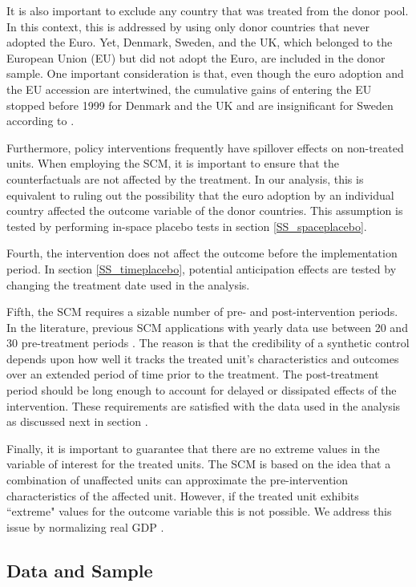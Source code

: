 \documentclass[12pt]{article}
\begin{document}
It is also important to exclude any country that was treated from the donor pool. In this context, this is addressed by using only donor countries that never adopted the Euro. Yet, Denmark, Sweden, and the UK, which belonged to the European Union (EU) but did not adopt the Euro, are included in the donor sample. One important consideration is that, even though the euro adoption and the EU accession are intertwined, the cumulative gains of entering the EU stopped before 1999 for Denmark and the UK and are insignificant for Sweden according to \cite{Campos2018}. 

Furthermore, policy interventions frequently have spillover effects on non-treated units. When employing the SCM, it is important to ensure that the counterfactuals are not affected by the treatment. In our analysis, this is equivalent to ruling out the possibility that the euro adoption by an individual country affected the outcome variable of the donor countries. This assumption is tested by performing in-space placebo tests in section \ref{SS_spaceplacebo}.

Fourth, the intervention does not affect the outcome before the implementation period. In section \ref{SS_timeplacebo}, potential anticipation effects are tested by changing the treatment date used in the analysis.

Fifth, the SCM requires a sizable number of pre- and post-intervention periods. In the literature, previous SCM applications with yearly data use between 20 \citep{Abadie2003} and 30 pre-treatment periods \citep{Abadie2015}. The reason is that the credibility of a synthetic control depends upon how well it tracks the treated unit’s characteristics and outcomes over an extended period of time prior to the treatment. The post-treatment period should be long enough to account for delayed or dissipated effects of the intervention. These requirements are satisfied with the data used in the analysis as discussed next in section \label{SS_Data}.

Finally, it is important to guarantee that there are no extreme values in the variable of interest for the treated units. The SCM is based on the idea that a combination of unaffected units can approximate the pre-intervention characteristics of the affected unit. However, if the treated unit exhibits ``extreme" values for the outcome variable this is not possible. We address this issue by normalizing real GDP \citep{Born2018}.  


\subsection{Data and Sample \label{SS_Data}}
\end{document}
